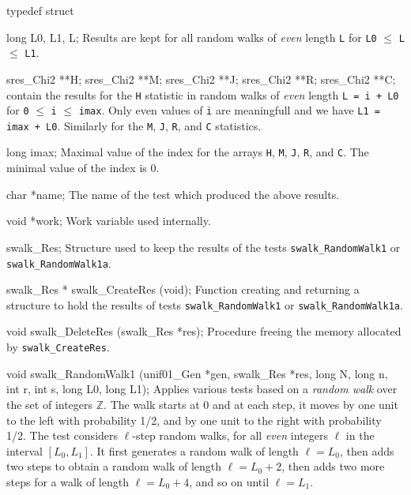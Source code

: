 typedef struct {

   long L0, L1, L;
\endcode
 \tabb Results are kept for all random walks of {\em even} length  {\tt L}
   for {\tt L0} $\le$  {\tt L} $\le$ {\tt L1}.
 \endtabb
\code

   sres_Chi2 **H;
   sres_Chi2 **M;
   sres_Chi2 **J;
   sres_Chi2 **R;
   sres_Chi2 **C;
\endcode
  contain the results for the {\tt H} statistic
  in random walks of {\em even} length {\tt L = i + L0} for
  {\tt 0} $\le$ {\tt i} $\le$ {\tt imax}. Only even values of {\tt i} are
   meaningfull and we have  {\tt L1 = imax + L0}.
   Similarly for the {\tt M}, {\tt J}, {\tt R}, and {\tt C} statistics.
 \endtabb
\code

   long imax;
\endcode
 \tabb Maximal value of the index for the arrays {\tt H}, {\tt M},
 {\tt J}, {\tt R}, and {\tt C}. The minimal value of the index is 0.
 \endtabb
\code

   char *name;
\endcode
 \tabb
  The name of the test which produced the above results.
 \endtabb
\code

   void *work;
\endcode
 \tabb Work variable used internally.
 \endtabb
\code

} swalk_Res;
\endcode
 \tab Structure used to keep the results of
  the tests {\tt swalk\_RandomWalk1} or  {\tt swalk\_RandomWalk1a}.
 \endtab
\code


swalk_Res * swalk_CreateRes (void);
\endcode
 \tab
  Function creating and returning a structure to hold the results
  of tests {\tt swalk\_RandomWalk1} or  {\tt swalk\_RandomWalk1a}.
 \endtab
\code


void swalk_DeleteRes (swalk_Res *res);
\endcode
 \tab
  Procedure freeing the memory allocated by {\tt swalk\_CreateRes}.
 \endtab


\fi %



\code

void swalk_RandomWalk1 (unif01_Gen *gen, swalk_Res *res, long N, long n,
                        int r, int s, long L0, long L1);
\endcode
 \tab
   Applies various tests 
   based on a {\em random walk\/} over the
   set of integers $\mathbb{Z}$.  The walk starts at 0 and at each step,
   it moves by one unit to the left with probability 1/2,
   and by one unit to the right with probability 1/2.
   The test considers $\ell$-step random walks, for all {\em even\/}
   integers $\ell$ in the interval $[L_0, L_1]$.
   It first generates a random walk of length $\ell = L_0$, then adds
   two steps to obtain a random walk of length $\ell = L_0+2$,
   then adds two more steps for a walk of length $\ell = L_0+4$,
   and so on until $\ell = L_1$.


